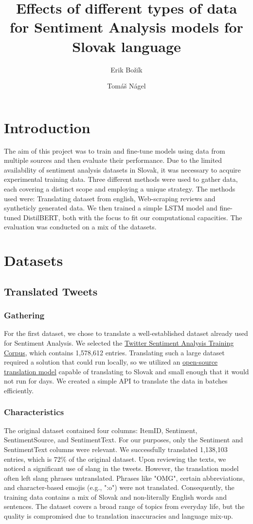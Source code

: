 \documentclass[11pt]{article}
\title{Effects of different types of data for Sentiment Analysis models for Slovak language}
\author{Erik Božík \and Tomáš Nágel}
\begin{document}
\maketitle

\section{Introduction}

The aim of this project was to train and fine-tune models using data from multiple sources and then evaluate their performance. Due to the limited availability of sentiment analysis datasets in Slovak, it was necessary to acquire experimental training data. Three different methods were used to gather data, each covering a distinct scope and employing a unique strategy. The methods used were: Translating dataset from english, Web-scraping reviews and syntheticly generated data. We then trained a simple LSTM model and fine-tuned DistilBERT, both with the focus to fit our computational capacities. The evaluation was conducted on a mix of the datasets.

\section{Datasets}
\subsection{Translated Tweets}
\subsubsection{Gathering}
For the first dataset, we chose to translate a well-established dataset already used for Sentiment Analysis. We selected the \href{http://thinknook.com/twitter-sentiment-analysis-training-corpus-dataset-2012-09-22/}{Twitter Sentiment Analysis Training Corpus}, which contains 1,578,612 entries. Translating such a large dataset required a solution that could run locally, so we utilized an \href{https://huggingface.co/michaelfeil/ct2fast-m2m100_1.2B}{open-source translation model} capable of translating to Slovak and small enough that it would not run for days. We created a simple API to translate the data in batches efficiently.
\subsubsection{Characteristics}
The original dataset contained four columns: ItemID, Sentiment, SentimentSource, and SentimentText. For our purposes, only the Sentiment and SentimentText columns were relevant. We successfully translated 1,138,103 entries, which is 72\% of the original dataset. Upon reviewing the texts, we noticed a significant use of slang in the tweets. However, the translation model often left slang phrases untranslated. Phrases like "OMG", certain abbreviations, and character-based emojis (e.g., ":o") were not translated. Consequently, the training data contains a mix of Slovak and non-literally English words and sentences. The dataset covers a broad range of topics from everyday life, but the quality is compromised due to translation inaccuracies and language mix-up.
\end{document}
